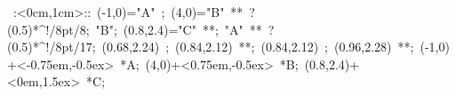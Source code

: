 %

\hbox{
\xy    <1cm,0cm>:<0cm,1cm>::
       (-1,0)="A" ; (4,0)="B" **\dir{-} ?(0.5)*^!/8pt/{8};
       "B"; (0.8,2.4)="C" **\dir{-}; "A" **\dir{-} ?(0.5)*^!/8pt/{17}; 
       (0.68,2.24) ; (0.84,2.12) **\dir{-};  
       (0.84,2.12) ; (0.96,2.28) **\dir{-};  
       (-1,0)+<-0.75em,-0.5ex> *{A};
       (4,0)+<0.75em,-0.5ex> *{B};
       (0.8,2.4)+<0em,1.5ex> *{C};
       \endxy}
	   

